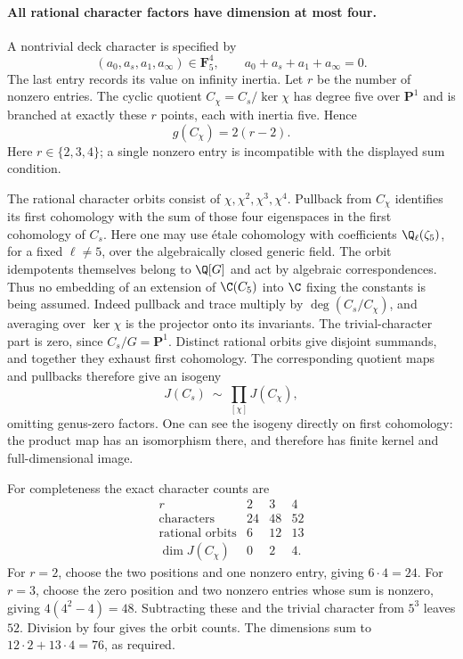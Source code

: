 \paragraph{All rational character factors have dimension at most four.}
A nontrivial deck character is specified by
\[
 (a_0,a_s,a_1,a_\infty)\in\mathbf F_5^4,
       \qquad a_0+a_s+a_1+a_\infty=0.
\]
The last entry records its value on infinity inertia.
Let $r$ be the number of nonzero entries.  The cyclic
quotient $C_\chi=C_s/\ker\chi$ has degree five over
$\mathbf P^1$ and is branched at exactly these $r$
points, each with inertia five.  Hence
\[
                      g(C_\chi)=2(r-2).          \tag{C28c}
\]
Here $r\in\{2,3,4\}$; a single nonzero entry is
incompatible with the displayed sum condition.

The rational character orbits consist of
$\chi,\chi^2,\chi^3,\chi^4$.  Pullback from $C_\chi$
identifies its first cohomology with the sum
of those four eigenspaces in the first cohomology of $C_s$.
Here one may use \'etale cohomology with coefficients
$\Q_\ell(\zeta_5)$, for a fixed $\ell\ne5$, over
the algebraically closed generic field.  The orbit
idempotents themselves belong to $\Q[G]$ and act by
algebraic correspondences.  Thus no embedding of an
extension of $\C(C_5)$ into $\C$ fixing the constants
is being assumed.
Indeed pullback and trace multiply by $\deg(C_s/C_\chi)$,
and averaging over $\ker\chi$ is the projector onto
its invariants.  The trivial-character part is zero,
since $C_s/G=\mathbf P^1$.
Distinct rational orbits give disjoint summands, and
together they exhaust first cohomology.  The corresponding
quotient maps and pullbacks therefore give an isogeny
\[
             J(C_s)\ \sim\ \prod_{[\chi]} J(C_\chi),
                                                        \tag{C28d}
\]
omitting genus-zero factors.  One can see the isogeny
directly on first cohomology: the product map has an
isomorphism there, and therefore has finite kernel and
full-dimensional image.

For completeness the exact character counts are
\[
\begin{array}{c|ccc}
 r&2&3&4\\\hline
 \text{characters}&24&48&52\\
 \text{rational orbits}&6&12&13\\
 \dim J(C_\chi)&0&2&4 .
\end{array}                                             \tag{C28e}
\]
For $r=2$, choose the two positions and one nonzero
entry, giving $6\cdot4=24$.  For $r=3$, choose the
zero position and two nonzero entries whose sum is
nonzero, giving $4(4^2-4)=48$.  Subtracting these and
the trivial character from $5^3$ leaves $52$.
Division by four gives the orbit counts.  The dimensions
sum to $12\cdot2+13\cdot4=76$, as required.

